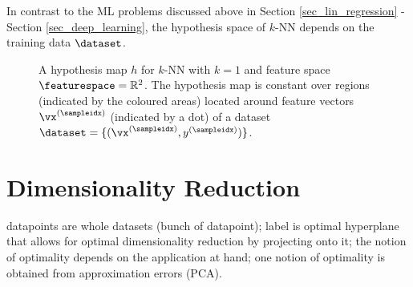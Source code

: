 \documentclass[12pt]{report}
\def\biglen{20cm} %
\def\maxxy{4} %
\begin{document}
In contrast to the ML problems discussed above in Section \ref{sec_lin_regression} - Section \ref{sec_deep_learning}, 
the hypothesis space of $k$-NN depends on the training data $\dataset$. 
\begin{figure}[htbp]
    \centering
    \label{fig_voronoi}
        \caption{A hypothesis map $h$ for $k$-NN with $k=1$ and feature space $\featurespace = \mathbb{R}^{2}$. 
        	The hypothesis map is constant over regions (indicated by the coloured areas) located around feature 
        	vectors $\vx^{(\sampleidx)}$ (indicated by a dot) of a dataset $\dataset=\{(\vx^{(\sampleidx)},y^{(\sampleidx)})\}$.}
\end{figure}

\section{Dimensionality Reduction} 
\label{sec_dim_reduction}
datapoints are whole datasets (bunch of datapoint); label is optimal hyperplane that allows 
for optimal dimensionality reduction by projecting onto it; the notion of optimality depends 
on the application at hand; one notion of optimality is obtained from approximation errors (PCA).  
\end{document}
